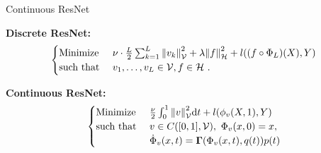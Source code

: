 \documentclass[8pt]{beamer}
\newcommand{\cH}{\mathcal{H}}
\newcommand{\cV}{\mathcal{V}}
\begin{document}
	\begin{frame}{Continuous ResNet}
		
		\textbf{Discrete ResNet:}
		\begin{equation*}
		\label{prob:min-v-f}
			\begin{cases}
				\text{Minimize~} & \nu \cdot \frac{L}{2} \sum_{k=1}^{L} \norm{v_k}_\cV^2
				+ \lambda \norm{f}_\cH^2 
				+ l((f \circ \Phi_L)(X), Y) \\
				\text{such that~} & v_1, \ldots, v_L \in \cV, f \in \cH \ .
			\end{cases}
		\end{equation*}
		
		\textbf{Continuous ResNet:}
		\begin{equation*}
			\begin{cases}
				\text{Minimize~}& \frac{\nu}{2} \int_{0}^{1} \norm{v}_\mathcal{V}^2 \mathrm{d}t
				+ l(\phi_v(X, 1), Y)\\
				\text{such that~}& v \in C([0, 1], \mathcal{V}),\ \Phi_v(x, 0) = x,\\
				&\dot{\Phi}_v(x, t) = \mathbf{\Gamma}(\Phi_v(x, t), q(t)) p(t)
			\end{cases}
		\end{equation*}
	\end{frame}


\end{document}
